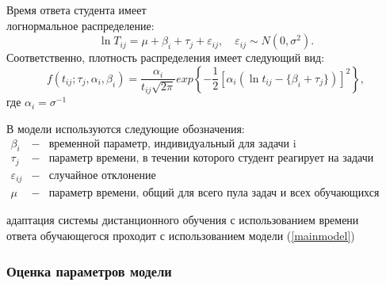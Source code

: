 Время ответа студента имеет \\логнормальное распределение:
\begin{equation}
\label{mainmodel}
\ln T_{ij} = \mu + \beta_i + \tau_j + \varepsilon_{ij},\quad \varepsilon_{ij} \sim N(0,\sigma^2).
\end{equation}
Соответственно, плотность распределения имеет следующий вид:
\begin{equation}
f(t_{ij};\tau_j,\alpha_i,\beta_i) = \frac{\alpha_i}{t_{ij}\sqrt{2\pi}}exp\left\{ -\frac{1}{2}[\alpha_i(\ln t_{ij} - \{\beta_i + \tau_j\})]^2 \right\},
\end{equation}
где $\alpha_i = \sigma^{-1}$

В модели используются следующие обозначения:
$$
\begin{array}{lll}
\beta_i &-& \mbox{временной параметр, индивидуальный для задачи i}\\
\tau_j &-& \mbox{параметр времени, в течении которого студент реагирует на задачи теста } \\
\varepsilon_{ij} &-& \mbox{случайное отклонение}\\
\mu &-& \mbox{параметр времени, общий для всего пула задач и всех обучающихся}
\end{array}
$$

адаптация системы дистанционного обучения с использованием времени \\ответа обучающегося проходит с использованием модели (\ref{mainmodel})

\subsubsection{Оценка параметров модели}
\label{opm}


